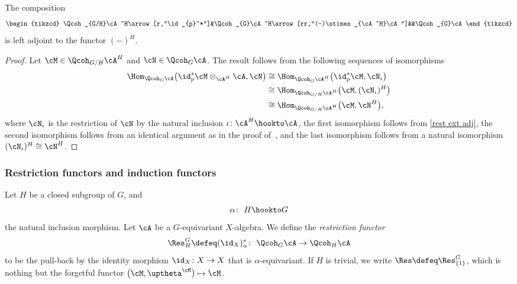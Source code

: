 \begin{prop}
The composition
\[
\begin{tikzcd}
\Qcoh_{G/H}\cA^H\arrow[r,"\id_{p}^*"]&\Qcoh_{G}\cA^H\arrow[rr,"(-)\otimes_{\cA^H}\cA"]&&\Qcoh_{G}\cA
\end{tikzcd}
\]
is left adjoint to the functor $(-)^H$.
\begin{proof}
Let $\cM\in \Qcoh_{G/H}\cA^H$ and $\cN\in \Qcoh_G\cA$. The result follows from the following sequences of isomorphisms
\begin{align*}
\Hom_{\Qcoh_{G}\cA}\big(\id_p^*\cM\otimes_{\cA^H}\cA,\cN\big)
&\cong\Hom_{\Qcoh_{G}\cA^H}\big(\id_p^*\cM,\cN_{\iota}\big)
\\
&\cong \Hom_{\Qcoh_{G/H}\cA^H}\big(\cM,(\cN_{\iota})^H\big)
\\
&\cong \Hom_{\Qcoh_{G/H}\cA^H}\big(\cM,\cN^H\big),
\end{align*}
where $\cN_{\iota}$ is the restriction of $\cN$ by the natural inclusion $\iota\colon \cA^H\hookto \cA$, the first isomorphism follows from \eqref{rest ext adj}, the second isomorphism follows from an identical argument as in the proof of~\cite[Lemma~2.22]{bfk}, and the last isomorphism follows from a natural isomorphism \mbox{$(\cN_{\iota})^H\cong \cN^H$}.
\end{proof}
\end{prop}

\subsubsection{Restriction functors and induction functors}
 Let $H$ be a closed subgroup of $G$, and
 \begin{gather*}
 \alpha\colon\ H\hookto G
 \end{gather*}
 the natural inclusion morphism. Let $\cA$ be a $G$-equivariant $X$-algebra. We define the {\it restriction functor}
\begin{gather*}
\Res^G_H\defeq (\id_X)_{\alpha}^*\colon\ \Qcoh_G\cA\to \Qcoh_H\cA
\end{gather*}
to be the pull-back by the identity morphism $\id_X\colon X\to X$ that is $\alpha$-equivariant. If $H$ is trivial, we write $\Res\defeq\Res^G_{\{1\}}$, which is nothing but the forgetful functor $\big(\cM,\uptheta^{\cM}\big)\mapsto \cM$.

